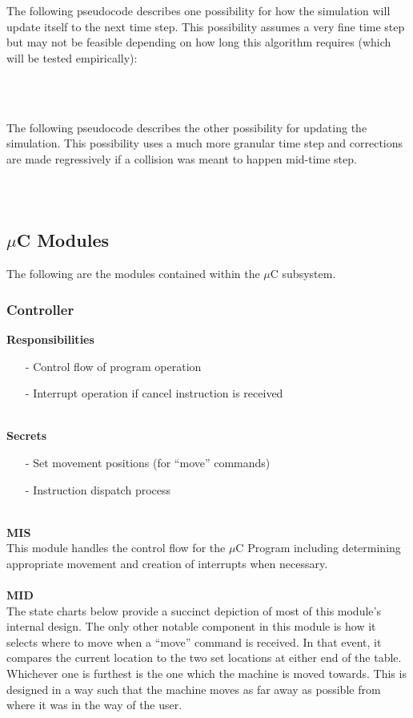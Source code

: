 \documentclass[titlepage]{article}
\begin{document}
The following pseudocode describes one possibility for how the simulation will update itself to the next time step. This possibility assumes a very fine time step but may not be feasible depending on how long this algorithm requires (which will be tested empirically):
\begin{lstlisting}

\end{lstlisting}~\\\\%
The following pseudocode describes the other possibility for updating the simulation. This possibility uses a much more granular time step and corrections are made regressively if a collision was meant to happen mid-time step.
\begin{lstlisting}

\end{lstlisting}~\\%
\subsection{$\mu$C Modules}
The following are the modules contained within the $\mu$C subsystem.
\subsubsection{Controller}
\textbf{Responsibilities}
\begin{itemize}
	\item[-] Control flow of program operation
	\item[-] Interrupt operation if cancel instruction is received
\end{itemize}~\\
\textbf{Secrets}
\begin{itemize}
	\item[-] Set movement positions (for ``move'' commands)
	\item[-] Instruction dispatch process
\end{itemize}~\\
\textbf{MIS}\\[2mm]
This module handles the control flow for the $\mu$C Program including determining appropriate movement and creation of interrupts when necessary. 
\\\\
\textbf{MID}\\[2mm]
The state charts below provide a succinct depiction of most of this module's internal design. The only other notable component in this module is how it selects where to move when a ``move'' command is received. In that event, it compares the current location to the two set locations at either end of the table. Whichever one is furthest is the one which the machine is moved towards. This is designed in a way such that the machine moves as far away as possible from where it was in the way of the user.
\\\\
\end{document}
